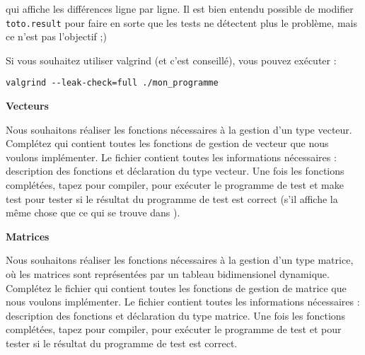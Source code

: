 \documentclass[10pt]{article}\usepackage[enonce]{exemptty}
\begin{document}
\noindent{}
qui affiche les différences ligne par ligne. Il est bien entendu possible de
modifier \texttt{toto.result} pour faire en sorte que les tests ne détectent
plus le problème, mais ce n'est pas l'objectif ;)

Si vous souhaitez utiliser valgrind (et c'est conseillé), vous pouvez exécuter :
\begin{verbatim}
valgrind --leak-check=full ./mon_programme
\end{verbatim}
\clearpage

\begin{Exercice} \textbf{Vecteurs}

  Nous souhaitons réaliser les fonctions nécessaires à la gestion d'un type
  vecteur. Complétez  qui contient toutes les fonctions de
  gestion de vecteur que nous voulons implémenter. Le fichier 
  contient toutes les informations nécessaires : description des fonctions et
  déclaration du type vecteur. Une fois les fonctions complétées, tapez
   pour compiler,  pour
  exécuter le programme de test et make test pour tester si le résultat du
  programme de test est correct (s'il affiche la même chose que ce qui se
  trouve dans ).
\end{Exercice}

\begin{Exercice} \textbf{Matrices}

  Nous souhaitons réaliser les fonctions nécessaires à la gestion d'un type
  matrice, où les matrices sont représentées par un tableau bidimensionel
  dynamique. Complétez le fichier  qui contient toutes les
  fonctions de gestion de matrice que nous voulons implémenter. Le fichier
   contient toutes les informations nécessaires : description
  des fonctions et déclaration du type matrice. Une fois les fonctions
  complétées, tapez  pour compiler,
   pour exécuter le programme de test et  pour tester si le résultat du programme de test est correct.
\end{Exercice}
\end{document}

